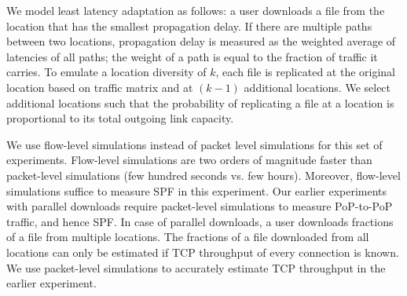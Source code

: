 We model least latency adaptation as follows: a user downloads a file from the location that has the smallest propagation delay.
If there are multiple paths between two locations, propagation delay is measured as the weighted average of latencies of all paths; 
the weight of a path is equal to the fraction of traffic it carries.
To emulate a location diversity of $k$, each file is replicated at the original location based on traffic matrix and at $(k-1)$ additional locations. 
We select additional locations such that the probability of replicating a file at a location is proportional to its total outgoing link capacity. 




We use  flow-level simulations instead of  packet level simulations for this set of experiments. 
Flow-level simulations are two  orders of magnitude faster than packet-level simulations (few hundred seconds vs. few hours).  
Moreover, flow-level simulations suffice to measure SPF in this experiment. 
Our earlier experiments with parallel downloads require packet-level simulations to measure PoP-to-PoP traffic, and hence SPF.
In case of  parallel downloads, a user downloads fractions of a file from multiple locations.
The fractions of a file downloaded from all locations can only be estimated if TCP throughput of every connection is known. 
We use packet-level simulations to accurately estimate TCP throughput in the earlier experiment.



%
%




